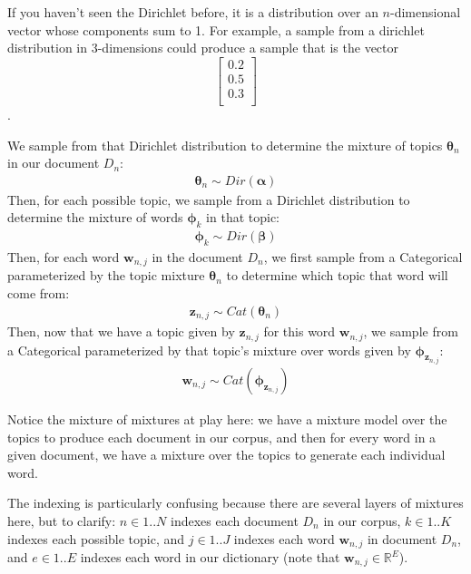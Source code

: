 \begin{warning}
    If you haven't seen the Dirichlet before, it is a distribution over an $n$-dimensional vector whose components sum to 1. For example, a sample from a dirichlet distribution in 3-dimensions could produce a sample that is the vector $$\begin{bmatrix} 0.2 \\ 0.5 \\ 0.3 \\ \end{bmatrix}$$.
\end{warning}

We sample from that Dirichlet distribution to determine the mixture of topics $\boldsymbol{\theta}_n$ in our document $D_n$:
\begin{align*}
    \boldsymbol{\theta}_n \sim Dir(\boldsymbol{\alpha})
\end{align*}
Then, for each possible topic, we sample from a Dirichlet distribution to determine the mixture of words $\boldsymbol{\phi}_k$ in that topic:
\begin{align*}
    \boldsymbol{\phi}_k \sim Dir(\boldsymbol{\beta})
\end{align*}
Then, for each word $\textbf{w}_{n, j}$ in the document $D_n$, we first sample from a Categorical parameterized by the topic mixture $\boldsymbol{\theta}_n$ to determine which topic that word will come from:
\begin{align*}
    \textbf{z}_{n, j} \sim Cat(\boldsymbol{\theta}_n)
\end{align*}
Then, now that we have a topic given by $\textbf{z}_{n, j}$ for this word $\textbf{w}_{n, j}$, we sample from a Categorical parameterized by that topic's mixture over words given by $\boldsymbol{\phi}_{\textbf{z}_{n, j}}$:
\begin{align*}
    \textbf{w}_{n, j} \sim Cat(\boldsymbol{\phi}_{\textbf{z}_{n, j}})
\end{align*}

Notice the mixture of mixtures at play here: we have a mixture model over the topics to produce each document in our corpus, and then for every word in a given document, we have a mixture over the topics to generate each individual word.

The indexing is particularly confusing because there are several layers of mixtures here, but to clarify: $n \in 1..N$ indexes each document $D_n$ in our corpus, $k \in 1..K$ indexes each possible topic, and $j \in 1..J$ indexes each word $\textbf{w}_{n,j}$ in document $D_n$, and $e \in 1..E$ indexes each word in our dictionary (note that $\textbf{w}_{n,j} \in \mathbb{R}^{E}$).

